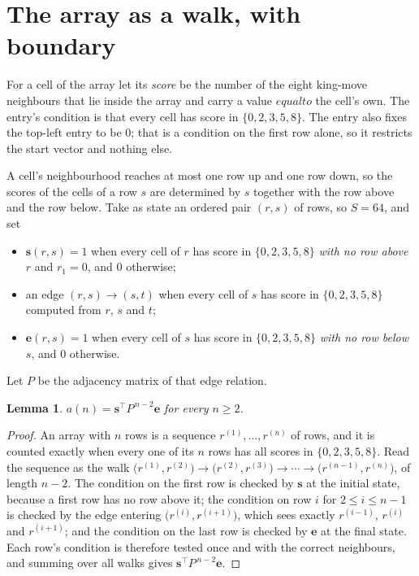 \documentclass[11pt,a4paper]{article}
\theoremstyle{plain}
\newtheorem{lemma}[theorem]{Lemma}
\theoremstyle{definition}
\begin{document}
\section{The array as a walk, with boundary}

For a cell of the array let its \emph{score} be the number of the eight king-move neighbours that lie inside
the array and carry a value $equal to$ the cell's own. The entry's condition is that every cell
has score in $\{0,2,3,5,8\}$. The entry also fixes the top-left entry to be $0$; that is a condition on the first row alone, so it restricts the start vector and nothing else.

A cell's neighbourhood reaches at most one row up and one row down, so the scores of the
cells of a row $s$ are determined by $s$ together with the row above and the row below.
Take as state an ordered pair $(r,s)$ of rows, so $S=64$, and set
\begin{itemize}
\item $\mathbf{s}(r,s)=1$ when every cell of $r$ has score in $\{0,2,3,5,8\}$ \emph{with no row
above $r$} and $r_1=0$, and $0$ otherwise;
\item an edge $(r,s)\to(s,t)$ when every cell of $s$ has score in $\{0,2,3,5,8\}$ computed from
$r$, $s$ and $t$;
\item $\mathbf{e}(r,s)=1$ when every cell of $s$ has score in $\{0,2,3,5,8\}$ \emph{with no row
below $s$}, and $0$ otherwise.
\end{itemize}
Let $P$ be the adjacency matrix of that edge relation.

\begin{lemma}\label{lem:walk}
$a(n)=\mathbf{s}^{\!\top}P^{\,n-2}\mathbf{e}$ for every $n\ge2$.
\end{lemma}

\begin{proof}
An array with $n$ rows is a sequence $r^{(1)},\dots,r^{(n)}$ of rows, and it is counted
exactly when every one of its $n$ rows has all scores in $\{0,2,3,5,8\}$. Read the sequence as the
walk $\bigl(r^{(1)},r^{(2)}\bigr)\to\bigl(r^{(2)},r^{(3)}\bigr)\to\cdots\to
\bigl(r^{(n-1)},r^{(n)}\bigr)$, of length $n-2$. The condition on the first row is
checked by $\mathbf{s}$ at the initial state, because a first row has no row above it; the
condition on row $i$ for $2\le i\le n-1$ is checked by the edge entering
$\bigl(r^{(i)},r^{(i+1)}\bigr)$, which sees exactly $r^{(i-1)}$, $r^{(i)}$ and
$r^{(i+1)}$; and the condition on the last row is checked by $\mathbf{e}$ at the final
state. Each row's condition is therefore tested once and with the correct neighbours, and
summing over all walks gives $\mathbf{s}^{\!\top}P^{\,n-2}\mathbf{e}$.
\end{proof}
\end{document}
